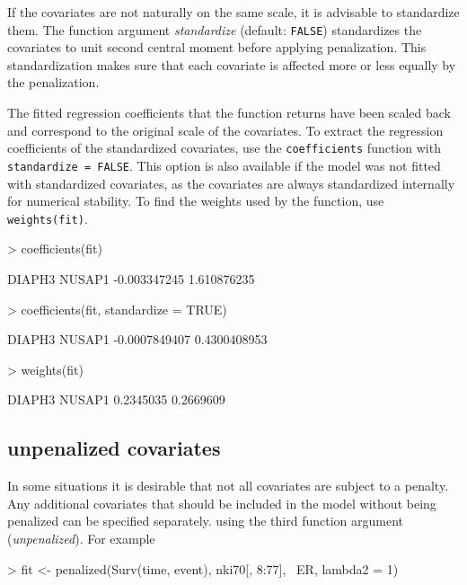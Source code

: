 \documentclass[a4paper]{article}
\newcommand{\Robject}[1]{{\texttt{#1}}}
\newcommand{\Rfunction}[1]{{\texttt{#1}}}
\newcommand{\Rfunarg}[1]{{\textit{#1}}}
\begin{document}
If the covariates are not naturally on the same scale, it is advisable to standardize them. The function argument \Rfunarg{standardize} (default: \Robject{FALSE}) standardizes the covariates to unit second central moment before applying penalization. This standardization makes sure that each covariate is affected more or less equally by the penalization.

The fitted regression coefficients that the function returns have been scaled back and correspond to the original scale of the covariates. To extract the regression coefficients of the standardized covariates, use the \Rfunction{coefficients} function with \Robject{standardize = FALSE}. This option is also available if the model was not fitted with standardized covariates, as the covariates are always standardized internally for numerical stability. To find the weights used by the function, use \Robject{weights(fit)}.

\begin{Schunk}
\begin{Sinput}
> coefficients(fit)
\end{Sinput}
\begin{Soutput}
      DIAPH3       NUSAP1 
-0.003347245  1.610876235 
\end{Soutput}
\begin{Sinput}
> coefficients(fit, standardize = TRUE)
\end{Sinput}
\begin{Soutput}
       DIAPH3        NUSAP1 
-0.0007849407  0.4300408953 
\end{Soutput}
\begin{Sinput}
> weights(fit)
\end{Sinput}
\begin{Soutput}
   DIAPH3    NUSAP1 
0.2345035 0.2669609 
\end{Soutput}
\end{Schunk}


\subsection{unpenalized covariates}

In some situations it is desirable that not all covariates are subject to a penalty. Any additional covariates that should be included in the model without being penalized can be specified separately. using the third function argument (\Rfunarg{unpenalized}). For example

\begin{Schunk}
\begin{Sinput}
> fit <- penalized(Surv(time, event), nki70[, 8:77], ~ER, lambda2 = 1)
\end{Sinput}
\end{Schunk}
\end{document}
